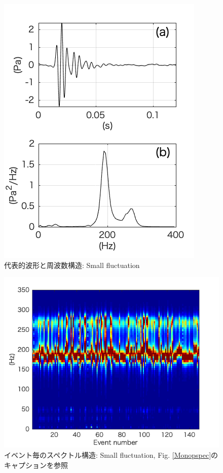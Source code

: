 \documentclass[12pt]{article}
\begin{document}
\begin{figure}[H]
\begin{center}
\includegraphics[scale=1] {Flctwaveform.png} 
\caption[代表的波形と周波数構造: Small fluctuation]
{代表的波形と周波数構造: Small fluctuation}
\label{Flctwaveform}
\end{center}
\end{figure} 

\begin{figure}[H]
\begin{center}
\includegraphics[scale=1] {Flctpspec.png} 
\caption[イベント毎のスペクトル構造: Small fluctuation]
{イベント毎のスペクトル構造: Small fluctuation, Fig. \ref{Monopspec}のキャプションを参照}
\label{Flctpspec}
\end{center}
\end{figure} 
\end{document}
